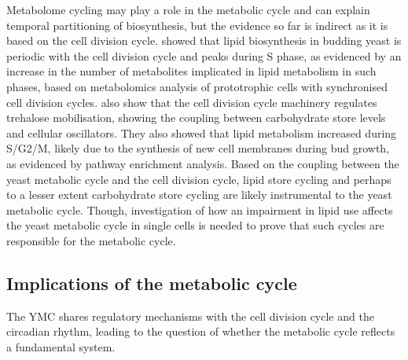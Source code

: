 
Metabolome cycling may play a role in the metabolic cycle and can explain temporal partitioning of biosynthesis, but the evidence so far is indirect as it is based on the cell division cycle.
\textcite{campbellBuildingBlocksAre2020} showed that lipid biosynthesis in budding yeast is periodic with the cell division cycle and peaks during S phase, as evidenced by an increase in the number of metabolites implicated in lipid metabolism in such phases, based on metabolomics analysis of prototrophic cells with synchronised cell division cycles.
\textcite{ewaldYeastCyclinDependentKinase2016} also show that the cell division cycle machinery regulates trehalose mobilisation, showing the coupling between carbohydrate store levels and cellular oscillators.
They also showed that lipid metabolism increased during S/G2/M, likely due to the synthesis of new cell membranes during bud growth, as evidenced by pathway enrichment analysis.
Based on the coupling between the yeast metabolic cycle and the cell division cycle, lipid store cycling and perhaps to a lesser extent carbohydrate store cycling are likely instrumental to the yeast metabolic cycle.
Though, investigation of how an impairment in lipid use affects the yeast metabolic cycle in single cells is needed to prove that such cycles are responsible for the metabolic cycle.


\subsection{Implications of the metabolic cycle}
\label{subsec:intro-ymc-implications}

The YMC shares regulatory mechanisms with the cell division cycle and the circadian rhythm,
leading to the question of whether the metabolic cycle reflects a fundamental system.

